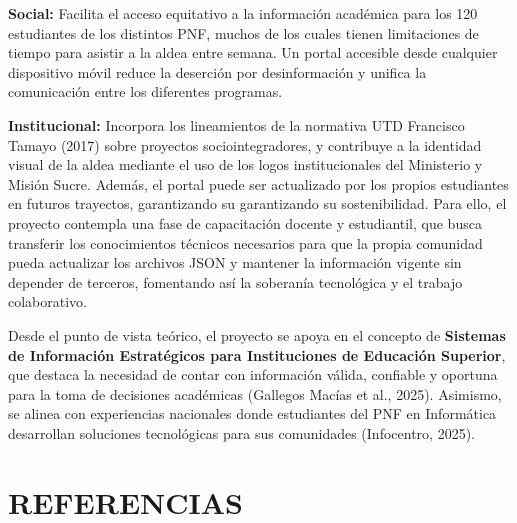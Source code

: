 \documentclass[12pt, letterpaper]{article}
\begin{document}
	\textbf{Social:} Facilita el acceso equitativo a la información académica para los 120 estudiantes de los distintos PNF, muchos de los cuales tienen limitaciones de tiempo para asistir a la aldea entre semana. Un portal accesible desde cualquier dispositivo móvil reduce la deserción por desinformación y unifica la comunicación entre los diferentes programas.
	
	\textbf{Institucional:} Incorpora los lineamientos de la normativa UTD Francisco Tamayo (2017) sobre proyectos sociointegradores, y contribuye a la identidad visual de la aldea mediante el uso de los logos institucionales del Ministerio y Misión Sucre. Además, el portal puede ser actualizado por los propios estudiantes en futuros trayectos, garantizando su garantizando su sostenibilidad. Para ello, el proyecto contempla una fase de capacitación docente y estudiantil, que busca transferir los conocimientos técnicos necesarios para que la propia comunidad pueda actualizar los archivos JSON y mantener la información vigente sin depender de terceros, fomentando así la soberanía tecnológica y el trabajo colaborativo.
	
	Desde el punto de vista teórico, el proyecto se apoya en el concepto de \textbf{Sistemas de Información Estratégicos para Instituciones de Educación Superior}, que destaca la necesidad de contar con información válida, confiable y oportuna para la toma de decisiones académicas (Gallegos Macías et al., 2025). Asimismo, se alinea con experiencias nacionales donde estudiantes del PNF en Informática desarrollan soluciones tecnológicas para sus comunidades (Infocentro, 2025).
	
	\newpage
	\section*{REFERENCIAS}
	
\end{document}
